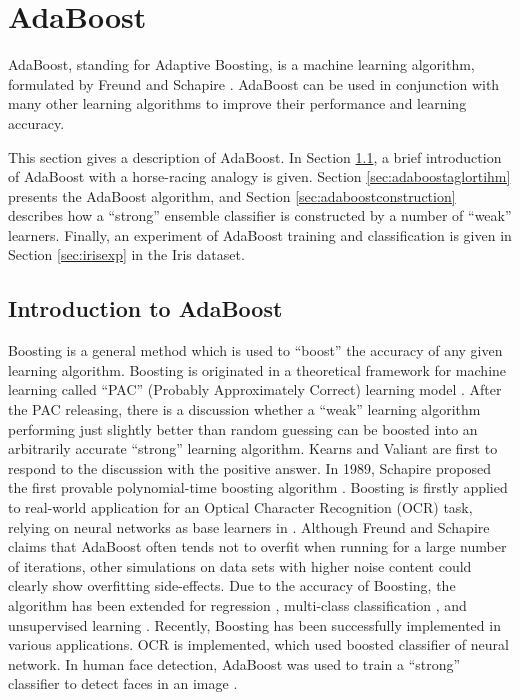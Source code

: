 \section{AdaBoost}
\label{sec:faceveri:adaboost}
AdaBoost, standing for Adaptive Boosting, is a machine learning algorithm, formulated by Freund and Schapire \cite{Freund1995,Freund1999,Schapire1999}. AdaBoost can be used in conjunction with many other learning algorithms to improve their performance and learning accuracy.

This section gives a description of AdaBoost. In \mbox{Section} \ref{sec:adaboostintro}, a brief introduction of AdaBoost with a horse-racing analogy is given. \mbox{Section} \ref{sec:adaboostaglortihm} presents the AdaBoost algorithm, and \mbox{Section} \ref{sec:adaboostconstruction} describes how a ``strong'' ensemble classifier is constructed by a number of ``weak'' learners. Finally, an experiment of AdaBoost training and classification is given in \mbox{Section} \ref{sec:irisexp} in the Iris dataset.

\subsection{Introduction to AdaBoost}
\label{sec:adaboostintro}
Boosting is a general method which is used to ``boost'' the accuracy of any given learning algorithm. Boosting is originated in a theoretical framework for machine learning called ``PAC'' (Probably Approximately Correct) learning model \cite{Valiant1984}. After the PAC releasing,  there is a discussion whether a ``weak'' learning algorithm performing just slightly better than random guessing can be boosted into an arbitrarily accurate ``strong'' learning algorithm. Kearns and Valiant \cite{Kearns1994} are first to respond to the discussion with the positive answer. In 1989, Schapire proposed the first provable polynomial-time boosting algorithm \cite{Schapire1990}. Boosting is firstly applied to real-world application for an Optical Character Recognition (OCR) task, relying on neural networks as base learners in \cite{Drucker1993}. Although  Freund and Schapire \cite{Freund1995,Freund1999,Schapire1999} claims that AdaBoost often tends not to overfit when running for a large number of iterations, other simulations \cite{Grove1998} on data sets with higher noise content could clearly show overfitting side-effects. Due to the accuracy of Boosting, the algorithm has been extended for regression \cite{Friedman1998}, multi-class classification \cite{Zhu2006}, and unsupervised learning \cite{Ratsch2002}. Recently, Boosting has been successfully implemented in various applications. OCR \cite{Drucker1993} is implemented, which used boosted classifier of neural network. In human face detection, AdaBoost was used to train a ``strong'' classifier to detect faces in an image \cite{Viola2001,Viola2004}.

